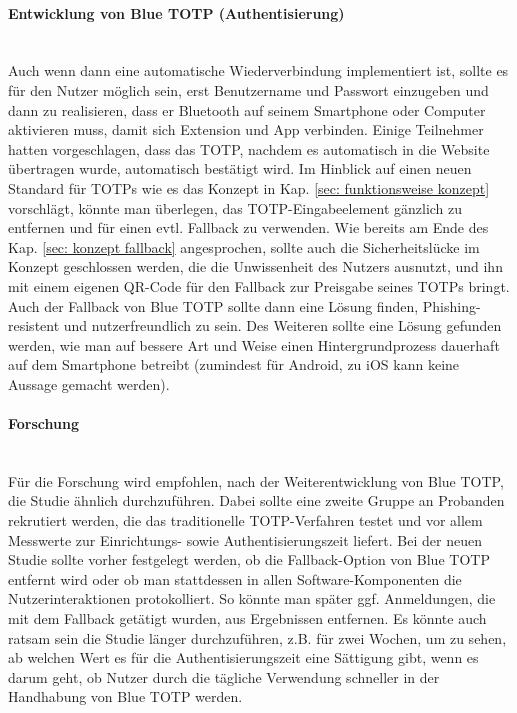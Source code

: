 \paragraph*{Entwicklung von Blue TOTP (Authentisierung)}
\mbox{} \vspace{0.1cm} \\
Auch wenn dann eine automatische Wiederverbindung implementiert ist, sollte es 
für den Nutzer möglich sein, erst Benutzername und Passwort einzugeben und 
dann zu realisieren, dass er Bluetooth auf seinem Smartphone oder Computer 
aktivieren muss, damit sich Extension und App verbinden. Einige Teilnehmer 
hatten vorgeschlagen, dass das TOTP, nachdem es automatisch in die Website 
übertragen wurde, automatisch bestätigt wird. Im Hinblick auf einen neuen 
Standard für TOTPs wie es das Konzept in Kap. \ref{sec: funktionsweise 
konzept} vorschlägt, könnte man überlegen, das TOTP-Eingabeelement gänzlich zu 
entfernen und für einen evtl. Fallback zu verwenden. Wie bereits am Ende des 
Kap. \ref{sec: konzept fallback} angesprochen, sollte auch die 
Sicherheitslücke im Konzept geschlossen werden, die die Unwissenheit des 
Nutzers ausnutzt, und ihn mit einem eigenen QR-Code für den Fallback zur 
Preisgabe seines TOTPs bringt. Auch der Fallback von Blue TOTP sollte dann 
eine Lösung finden, Phishing-resistent und nutzerfreundlich zu sein. Des Weiteren sollte eine Lösung gefunden werden, wie man auf bessere Art und Weise einen Hintergrundprozess dauerhaft auf dem Smartphone betreibt (zumindest für Android, zu iOS kann keine Aussage gemacht werden). 

\paragraph*{Forschung}
\mbox{} \vspace{0.1cm} \\
Für die Forschung wird empfohlen, nach der Weiterentwicklung von Blue TOTP, 
die Studie ähnlich durchzuführen. Dabei sollte eine zweite Gruppe an Probanden 
rekrutiert werden, die das traditionelle TOTP-Verfahren testet und vor allem 
Messwerte zur Einrichtungs- sowie Authentisierungszeit liefert. Bei der neuen 
Studie sollte vorher festgelegt werden, ob die Fallback-Option von Blue TOTP 
entfernt wird oder ob man stattdessen in allen Software-Komponenten die 
Nutzerinteraktionen protokolliert. So könnte man später ggf. Anmeldungen, die 
mit dem Fallback getätigt wurden, aus Ergebnissen entfernen.
Es könnte auch ratsam sein die Studie länger durchzuführen, z.B. für zwei 
Wochen, um zu sehen, ab welchen Wert es für die Authentisierungszeit eine 
Sättigung gibt, wenn es darum geht, ob Nutzer durch die tägliche Verwendung 
schneller in der Handhabung von Blue TOTP werden.